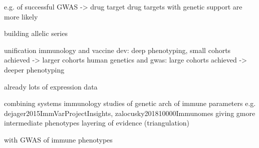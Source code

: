 \begin{outline}

        \3 e.g. of successful GWAS -> drug target
            \4 drug targets with genetic support are more likely

        \3 building allelic series

unification
    immunology and vaccine dev: deep phenotyping, small cohorts achieved -> larger cohorts
    human genetics and gwas: large cohorts achieved -> deeper phenotyping

    already lots of expression data

    combining systems immunology studies of genetic arch of immune parameters
            e.g. dejager2015ImmVarProjectInsights, zalocusky201810000Immunomes
        giving gmore intermediate phenotypes
        layering of evidence (triangulation)

    with GWAS of immune phenotypes

\end{outline}

